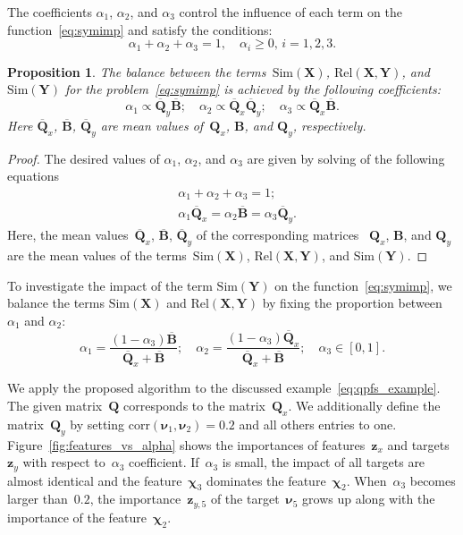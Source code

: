 \documentclass[12pt,twoside]{article}
\newtheorem{proposition}{Proposition}
\theoremstyle{definition}
\newcommand{\bz}{\mathbf{z}}
\newcommand{\bY}{\mathbf{Y}}
\newcommand{\bX}{\mathbf{X}}
\newcommand{\bB}{\mathbf{B}}
\newcommand{\bQ}{\mathbf{Q}}
\newcommand{\bchi}{\boldsymbol{\chi}}
\newcommand{\bnu}{\boldsymbol{\nu}}
\begin{document}
The coefficients $\alpha_1$, $\alpha_2$, and $\alpha_3$ control the influence of each term on the function~\eqref{eq:symimp} and satisfy the conditions:
\begin{equation*}
\alpha_1 + \alpha_2 + \alpha_3 = 1, \quad \alpha_i \geq 0, \, i = 1, 2, 3.
\end{equation*}
\begin{proposition}
	The balance between the terms~$\text{Sim}(\bX)$, $\text{Rel}(\bX, \bY)$, and $\text{Sim}(\bY)$ for the problem~\eqref{eq:symimp} is achieved by the following coefficients:
	\begin{equation}
	\alpha_1 \propto \overline{\bQ}_y \overline{\bB} ; \quad
	\alpha_2 \propto \overline{\bQ}_x \overline{\bQ}_y; \quad
	\alpha_3  \propto \overline{\bQ}_x \overline{\bB}.
	\label{eq:alpha_3}
	\end{equation}
	Here $\overline{\bQ}_x$, $\overline{\bB}$, $\overline{\bQ}_y$ are mean values of~$\bQ_x$, $\bB$, and $\bQ_y$, respectively.
	
\end{proposition}
\begin{proof}
	The desired values of $\alpha_1$, $\alpha_2$, and $\alpha_3$ are given by solving of the following equations
	\begin{align*}
	&\alpha_1 + \alpha_2 + \alpha_3 = 1; \\
	&\alpha_1 \overline{\bQ}_x = \alpha_2 \overline{\bB} = \alpha_3 \overline{\bQ}_y.
	\end{align*}
	Here, the mean values~$\overline{\bQ}_x$, $\overline{\bB}$, $\overline{\bQ}_y$ of the corresponding matrices ~$\bQ_x$, $\bB$, and $\bQ_y$ are the mean values of the terms~$\text{Sim}(\bX)$, $\text{Rel}(\bX, \bY)$, and $\text{Sim}(\bY)$.
\end{proof}
To investigate the impact of the term $\text{Sim}(\bY)$ on the function~\eqref{eq:symimp}, we balance the terms $\text{Sim}(\bX)$ and $\text{Rel}(\bX, \bY)$ by fixing the proportion between~$\alpha_1$ and $\alpha_2$:
\begin{equation}
\alpha_1 = \frac{(1 - \alpha_3)\overline{\bB}}{\overline{\bQ}_x + \overline{\bB}}; \quad
\alpha_2 = \frac{(1 - \alpha_3)\overline{\bQ}_x}{\overline{\bQ}_x + \overline{\bB}}; \quad
\alpha_3 \in [0, 1].
\label{eq:alphas3}
\end{equation}

We apply the proposed algorithm to the discussed example~\eqref{eq:qpfs_example}.
The given matrix~$\bQ$ corresponds to the matrix~$\bQ_x$.
We additionally define the matrix~$\bQ_y$ by setting $\text{corr}(\bnu_1, \bnu_2) = 0.2$ and all others entries to one.
Figure~\ref{fig:features_vs_alpha} shows the importances of features~$\bz_x$ and targets~$\bz_y$ with respect to~$\alpha_3$ coefficient.
If~$\alpha_3$ is small, the impact of all targets are almost identical and the feature~$\bchi_3$ dominates the feature~$\bchi_2$. When~$\alpha_3$ becomes larger than~$0.2$, the importance~$\bz_{y,5}$ of the target~$\bnu_5$ grows up along with the importance of the feature~$\bchi_2$.
\end{document}
